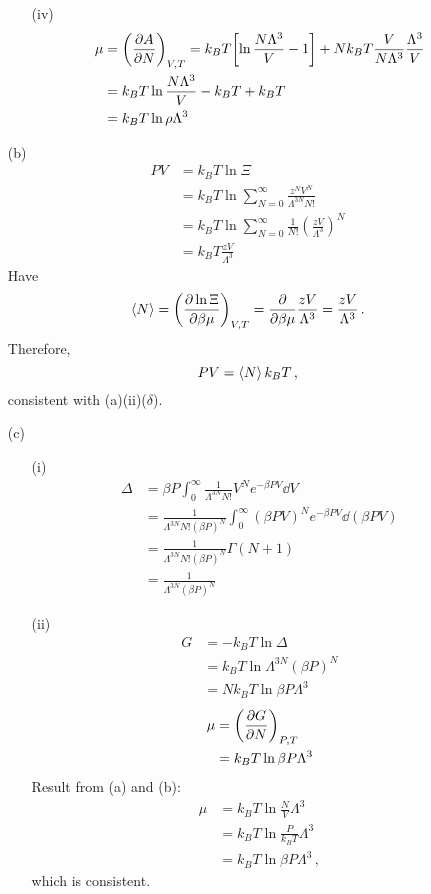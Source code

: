 \documentclass{article}
\begin{document}
\begin{enumerate}
\begin{enumerate}
            \item[(iv)]
            \begin{align*}
                \mu&=\qty(\pdv{A}{N})_{V,T}=k_BT\qty[\ln\frac{N\Lambda^3}{V}-1]+Nk_BT\frac{V}{N\Lambda^3}\frac{\Lambda^3}{V}\\
                &=k_BT\ln\frac{N\Lambda^3}{V}-k_BT+k_BT\\
                &=k_BT\ln\rho\Lambda^3
            \end{align*}
        \end{enumerate}
        \item[(b)]
        \begin{align*}
            PV&=k_BT\ln\Xi\\
            &=k_BT\ln\sum_{N=0}^{\infty}\frac{z^NV^N}{\Lambda^{3N}N!}\\
            &=k_BT\ln\sum_{N=0}^{\infty}\frac{1}{N!}(\frac{zV}{\Lambda^3})^N\\
            &=k_BT\frac{zV}{\Lambda^3}
        \end{align*}
        Have
        $$\expval{N}=\qty(\pdv{\ln\Xi}{\beta\mu})_{V,T}=\pdv{\beta\mu}\frac{zV}{\Lambda^3}=\frac{zV}{\Lambda^3}\,.$$
        Therefore,
        $$PV=\expval{N}k_BT\,,$$
        consistent with (a)(ii)($\delta$).
        \item[(c)]
        \begin{enumerate}
            \item[(i)]
            \begin{align*}
                \Delta&=\beta P\int_{0}^{\infty}\frac{1}{\Lambda^{3N}N!}V^N e^{-\beta PV}\dd{V}\\
                &=\frac{1}{\Lambda^{3N}N!(\beta P)^N}\int_{0}^{\infty}(\beta PV)^N e^{-\beta PV}\dd{(\beta PV)}\\
                &=\frac{1}{\Lambda^{3N}N!(\beta P)^N}\Gamma(N+1)\\
                &=\frac{1}{\Lambda^{3N}(\beta P)^N}
            \end{align*}
            \item[(ii)]
            \begin{align*}
                G&=-k_BT\ln\Delta\\
                &=k_BT\ln\Lambda^{3N}(\beta P)^N\\
                &=Nk_BT\ln\beta P\Lambda^3
            \end{align*}
            \begin{align*}
                \mu&=\qty(\pdv{G}{N})_{P,T}\\
                &=k_BT\ln\beta P\Lambda^3
            \end{align*}
            Result from (a) and (b):
            \begin{align*}
                \mu&=k_BT\ln\frac{N}{V}\Lambda^3\\
                &=k_BT\ln\frac{P}{k_BT}\Lambda^3\\
                &=k_BT\ln\beta P\Lambda^3\,,
            \end{align*}
            which is consistent.
        \end{enumerate}
    \end{enumerate}
\end{document}
